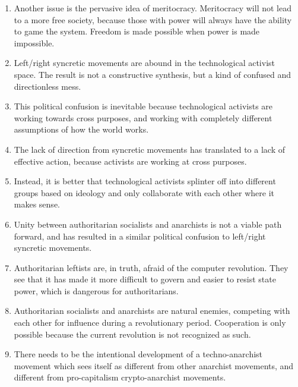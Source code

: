 \documentclass{article}
\begin{document}
\begin{enumerate}
\item Another issue is the pervasive idea of meritocracy. Meritocracy will not lead to a more free society, because those with power will always have the ability to game the system. Freedom is made possible when power is made impossible.
\item Left/right syncretic movements are abound in the technological activist space. The result is not a constructive synthesis, but a kind of confused and directionless mess.
\item This political confusion is inevitable because technological activists are working towards cross purposes, and working with completely different assumptions of how the world works.
\item The lack of direction from syncretic movements has translated to a lack of effective action, because activists are working at cross purposes.
\item Instead, it is better that technological activists splinter off into different groups based on ideology and only collaborate with each other where it makes sense.
\item Unity between authoritarian socialists and anarchists is not a viable path forward, and has resulted in a similar political confusion to left/right syncretic movements.
\item Authoritarian leftists are, in truth, afraid of the computer revolution. They see that it has made it more difficult to govern and easier to resist state power, which is dangerous for authoritarians.
\item Authoritarian socialists and anarchists are natural enemies, competing with each other for influence during a revolutionary period. Cooperation is only possible because the current revolution is not recognized as such.
\item There needs to be the intentional development of a techno-anarchist movement which sees itself as different from other anarchist movements, and different from pro-capitalism crypto-anarchist movements.
\end{enumerate}
\end{document}

